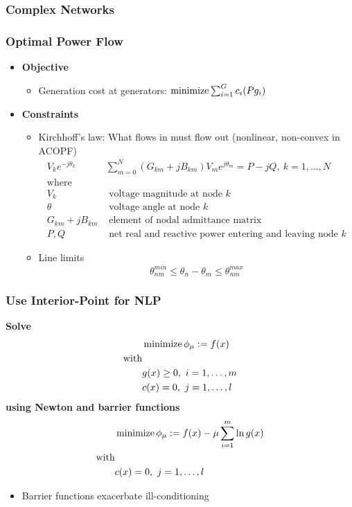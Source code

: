 \begin{frame}
  \frametitle{Complex Networks}
\end{frame}

\begin{frame}[fragile]
  \frametitle{Optimal Power Flow}
  \begin{itemize}
    \item {\bf Objective}
    \begin{itemize}
      \item Generation cost at generators:
      $ \minimize \sum^G_{i=1} c_i(Pg_i)$
    \end{itemize}
    \item {\bf Constraints}
    \begin{itemize}
      \item Kirchhoff's law: What flows in must flow out (nonlinear, non-convex in ACOPF)
      \begin{align*}
        V_k e^{-j\theta_k} & \sum^{N}_{m=0} (G_{km} + jB_{km})V_m e^{j\theta_m} = P - jQ,\ k = 1, \dots, N \\
        \text{where}\\
        V_k &\text{ voltage magnitude at node } k\\
        \theta &\text{ voltage angle at node } k\\
        G_{km} + jB_{km}& \text{ element of nodal admittance matrix}\\
        P, Q &\text{ net real and reactive power entering and leaving node } k
      \end{align*}
      \item Line limits \\
      $$ \theta^{min}_{nm} \leq \theta_n - \theta_m \leq \theta^{max}_{nm}$$
    \end{itemize}
  \end{itemize}
\end{frame}

\begin{frame}[fragile]
  \frametitle{Use Interior-Point for NLP}
  {\bf Solve}
  \begin{align*}
  &\minimize \phi_\mu := f(x)\\ 
  \text{with}&\\
  &g(x) \geq 0, \ i=1,\dots, m \\
  &c(x) = 0, \ j=1,\dots, l \\
  \end{align*}
  {\bf using Newton and barrier functions}
  \begin{align*}
  &\minimize \phi_\mu := f(x) - \mu \sum^m_{i=1} \ln g(x)\\ 
  \text{with}&\\
  &c(x) = 0, \ j=1,\dots, l 
  \end{align*}
  \begin{itemize}
    \item Barrier functions exacerbate ill-conditioning
  \end{itemize}
\end{frame}

